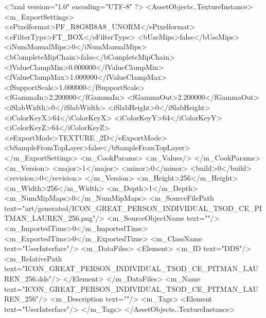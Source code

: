 <?xml version="1.0" encoding="UTF-8" ?>
<AssetObjects..TextureInstance>
	<m_ExportSettings>
		<ePixelformat>PF_R8G8B8A8_UNORM</ePixelformat>
		<eFilterType>FT_BOX</eFilterType>
		<bUseMips>false</bUseMips>
		<iNumManualMips>0</iNumManualMips>
		<bCompleteMipChain>false</bCompleteMipChain>
		<fValueClampMin>0.000000</fValueClampMin>
		<fValueClampMax>1.000000</fValueClampMax>
		<fSupportScale>1.000000</fSupportScale>
		<fGammaIn>2.200000</fGammaIn>
		<fGammaOut>2.200000</fGammaOut>
		<iSlabWidth>0</iSlabWidth>
		<iSlabHeight>0</iSlabHeight>
		<iColorKeyX>64</iColorKeyX>
		<iColorKeyY>64</iColorKeyY>
		<iColorKeyZ>64</iColorKeyZ>
		<eExportMode>TEXTURE_2D</eExportMode>
		<bSampleFromTopLayer>false</bSampleFromTopLayer>
	</m_ExportSettings>
	<m_CookParams>
		<m_Values/>
	</m_CookParams>
	<m_Version>
		<major>1</major>
		<minor>0</minor>
		<build>0</build>
		<revision>0</revision>
	</m_Version>
	<m_Height>256</m_Height>
	<m_Width>256</m_Width>
	<m_Depth>1</m_Depth>
	<m_NumMipMaps>0</m_NumMipMaps>
	<m_SourceFilePath text="art/generated/ICON_GREAT_PERSON_INDIVIDUAL_TSOD_CE_PITMAN_LAUREN_256.png"/>
	<m_SourceObjectName text=""/>
	<m_ImportedTime>0</m_ImportedTime>
	<m_ExportedTime>0</m_ExportedTime>
	<m_ClassName text="UserInterface"/>
	<m_DataFiles>
		<Element>
			<m_ID text="DDS"/>
			<m_RelativePath text="ICON_GREAT_PERSON_INDIVIDUAL_TSOD_CE_PITMAN_LAUREN_256.dds"/>
		</Element>
	</m_DataFiles>
	<m_Name text="ICON_GREAT_PERSON_INDIVIDUAL_TSOD_CE_PITMAN_LAUREN_256"/>
	<m_Description text=""/>
	<m_Tags>
		<Element text="UserInterface"/>
	</m_Tags>
</AssetObjects..TextureInstance>
